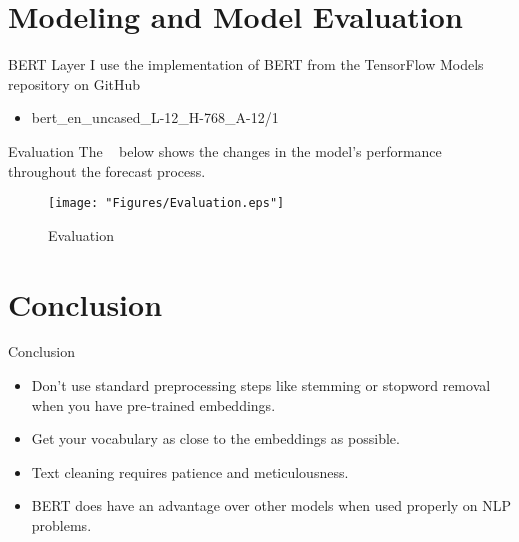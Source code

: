 \documentclass[
 size=12pt,
 paper=smartboard, %
 mode=present, %
 display=slides, %
 style=tuliplab,  %
 pauseslide,
 fleqn,leqno,clock]{powerdot}
\begin{document}
\section{Modeling and Model Evaluation}
\begin{slide}{BERT Layer}
	I use the implementation of BERT from the TensorFlow Models 
	repository on GitHub
  \begin{itemize}
    \item bert\_en\_uncased\_L-12\_H-768\_A-12/1
  \end{itemize}
\end{slide}

\begin{slide}{Evaluation}
The  ~ below shows the changes 
in the model's performance throughout the forecast process.

\begin{figure}[tbph]
	\centering
	\texttt{[image: "Figures/Evaluation.eps"]}
	\caption{Evaluation}
	\label{fig:Evaluation}
\end{figure}
\end{slide}

\section{Conclusion}
\begin{slide}{Conclusion}
\begin{itemize}
	\item Don't use standard preprocessing steps like stemming or 
	stopword removal when you have pre-trained embeddings.
	\item Get your vocabulary as close to the embeddings as possible.
	\item Text cleaning requires patience and meticulousness. 
	\item BERT does have an advantage over other models when 
	used properly on NLP problems.
\end{itemize}
\end{slide}


\begin{wideslide}[toc=,bm=]{}
  \centering
  \twocolumn[
    lcolwidth=0.35\linewidth,
    rcolwidth=0.65\linewidth
  ]
  {
  }
  {


    \textcolor{black}{\scalebox{2.0}{Thank you \& Question}}


  }
\end{wideslide}
\end{document}
